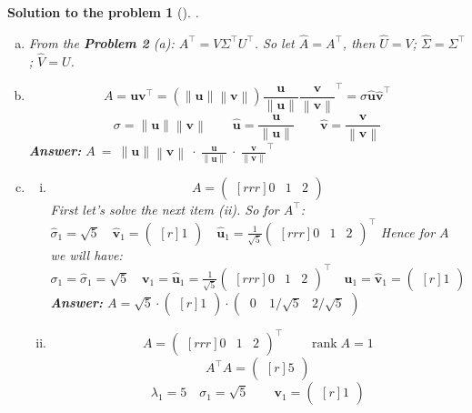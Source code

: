 \documentclass[12pt,a4]{article}
\newtheorem{solution}{Solution to the problem}
\newcommand\rank{\operatorname{rank}}
\newcommand{\bu}{{\mathbf u}}
\newcommand{\bv}{{\mathbf v}}
\newcommand{\norm}[1]{\left\lVert#1\right\rVert}
\newcommand{\answer}[1]{\textbf{Answer:} #1}
\begin{document}
\begin{solution}[] \rm .
\begin{enumerate}[(a)]
\item From the \textbf{Problem 2} (a): $A^\top = V \Sigma^\top U^\top$. So let $\hat A = A^\top$, then $\hat U = V$; $\hat\Sigma=\Sigma^\top$; $\hat V = U$.
\item
\[
A = \bu\bv^\top = (\norm{\bu}\norm{\bv})\frac{\bu}{\norm{\bu}}\frac{\bv}{\norm{\bv}}^\top = \sigma \hat \bu \hat \bv^\top
\]
\[
\sigma = \norm{\bu}\norm{\bv}
\qquad
\hat \bu = \frac{\bu}{\norm{\bu}}
\qquad
\hat \bv = \frac{\bv}{\norm{\bv}}
\]
\answer{$
A ~ = ~\norm{\bu}\norm{\bv}~\cdot~\frac{\bu}{\norm{\bu}}~\cdot~\frac{\bv}{\norm{\bv}}^\top
$}
\item
\begin{enumerate}[(i)]
	\item
\[
A =
\begin{pmatrix}[rrr]
0 & 1 & 2
\end{pmatrix}
\]
First let's solve the next item (ii). So for $A^\top$:
$
\hat \sigma_1 = \sqrt5
\quad \hat\bv_1 = \begin{pmatrix}[r] 1 \end{pmatrix}
\quad \hat\bu_1 = \frac1{\sqrt5} \begin{pmatrix}[rrr] 0 & 1 & 2 \end{pmatrix}^\top
$
Hence for $A$ we will have:
$
\sigma_1 = \hat \sigma_1 = \sqrt5
\quad \bv_1 = \hat \bu_1 = \frac1{\sqrt5} \begin{pmatrix}[rrr] 0 & 1 & 2 \end{pmatrix}^\top
\quad \bu_1 = \hat \bv_1 = \begin{pmatrix}[r] 1 \end{pmatrix}
$
\answer{$
A = \sqrt5 \cdot \begin{pmatrix}[r] 1 \end{pmatrix} \cdot \begin{pmatrix} ~0~ & 1/\sqrt5 & 2/\sqrt5 \end{pmatrix}
$}
	\item
\[
A =
\begin{pmatrix}[rrr]
0 & 1 & 2
\end{pmatrix}^\top
\qquad
\rank A = 1
\]
\[
A^\top A = \begin{pmatrix}[r] 5 \end{pmatrix}
\]
\[
\lambda_1 = 5 \quad \sigma_1 = \sqrt5
\qquad \bv_1 = \begin{pmatrix}[r] 1 \end{pmatrix}
\]
\end{enumerate}
\end{enumerate}
\end{solution}
\end{document}
